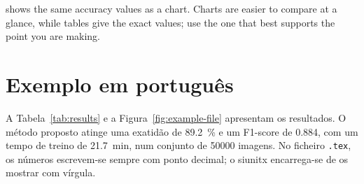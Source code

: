  shows the same accuracy values as a chart. Charts
are easier to compare at a glance, while tables give the exact values; use
the one that best supports the point you are making.

\section{Exemplo em português}
\label{sec:results:pt}

\begin{otherlanguage}{portuguese}

A Tabela~\ref{tab:results} e a Figura~\ref{fig:example-file} apresentam os
resultados. O método proposto atinge uma exatidão de
\qty{89.2}{\percent} e um F1-score de \num{0.884}, com um tempo de treino de
\qty{21.7}{\minute}, num conjunto de \num{50000} imagens. No ficheiro
\texttt{.tex}, os números escrevem-se sempre com ponto decimal; o siunitx
encarrega-se de os mostrar com vírgula.

\end{otherlanguage}
